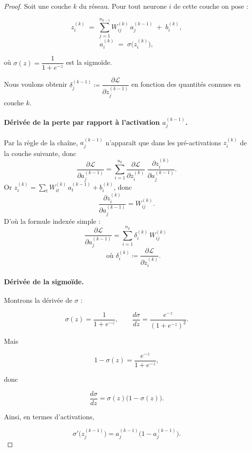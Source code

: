 \documentclass[12pt,a4paper]{report}
\numberwithin{equation}{section}
\begin{document}
\begin{proof}
  
Soit une couche \(k\) du réseau. Pour tout neurone \(i\) de cette couche on pose :

$$z^{(k)}_i \;=\; \sum_{j=1}^{n_{k-1}} W^{(k)}_{ij}\, a^{(k-1)}_j \;+\; b^{(k)}_i,$$
\qquad
$$a^{(k)}_i \;=\; \sigma\bigl(z^{(k)}_i\bigr),$$

où \(\sigma(z)=\dfrac{1}{1+e^{-z}}\) est la sigmoïde.

Nous voulons obtenir \(\delta^{(k-1)}_j \coloneqq \dfrac{\partial \mathcal{L}}{\partial z^{(k-1)}_j}\) en fonction des quantités connues en couche \(k\).

\bigskip

\paragraph{Dérivée de la perte par rapport à l'activation \(a^{(k-1)}_j\).}

Par la règle de la chaîne, \(a^{(k-1)}_j\) n'apparaît que dans les pré-activations \(z^{(k)}_i\) de la couche suivante, donc
\[
\frac{\partial \mathcal{L}}{\partial a^{(k-1)}_j}
= \sum_{i=1}^{n_k} \frac{\partial \mathcal{L}}{\partial z^{(k)}_i}\;
  \frac{\partial z^{(k)}_i}{\partial a^{(k-1)}_j}.
\]
Or \(z^{(k)}_i = \sum_{t} W^{(k)}_{it}\, a^{(k-1)}_t + b^{(k)}_i\), donc
\[
\frac{\partial z^{(k)}_i}{\partial a^{(k-1)}_j} = W^{(k)}_{ij}.
\]
D'où la formule indexée simple :
$$
\frac{\partial \mathcal{L}}{\partial a^{(k-1)}_j}
= \sum_{i=1}^{n_k} \delta^{(k)}_i \, W^{(k)}_{ij}
\;
$$
$$
\qquad\text{où }\delta^{(k)}_i \coloneqq \frac{\partial \mathcal{L}}{\partial z^{(k)}_i}.
$$

\bigskip

\paragraph{Dérivée de la sigmoïde.}
Montrons la dérivée de \(\sigma\) :

$$\sigma(z)=\frac{1}{1+e^{-z}},\qquad
\frac{d\sigma}{dz}
= \frac{e^{-z}}{(1+e^{-z})^2}.$$

Mais

$$1-\sigma(z)=\frac{e^{-z}}{1+e^{-z}},$$

donc

$$\frac{d\sigma}{dz}
= \sigma(z)\bigl(1-\sigma(z)\bigr).$$

Ainsi, en termes d'activations,

$$\sigma'\bigl(z^{(k-1)}_j\bigr) = a^{(k-1)}_j\bigl(1-a^{(k-1)}_j\bigr).$$


\end{proof}
\end{document}
